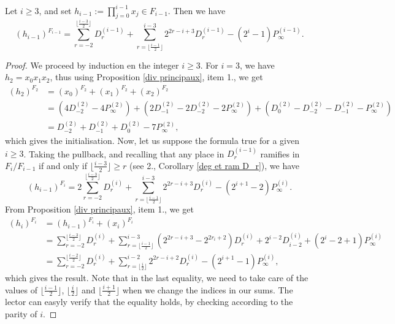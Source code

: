 \documentclass[10pt]{article}
\begin{document}
\s

\begin{proposition} \label{function h}
Let $i \geq 3$, and set $h_{i-1} := \prod\limits_{j=0}^{i-1}x_j \in F_{i-1}$. Then we have 
\[(h_{i-1})^{F_{i-1}} = \sum\limits_{r=-2}^{\lfloor \frac{i-3}{2}\rfloor} D_r^{(i-1)} + \sum\limits_{r=\lfloor \frac{i-1}{2}\rfloor}^{i-3} 2^{2r-i+3}D_r^{(i-1)} - (2^{i}-1) P_{\infty}^{(i-1)}.\]

\end{proposition}

\s

\begin{proof}
We proceed by induction en the integer $i \geq 3$. For $i=3$, we have $h_2 = x_0x_1x_2$, thus using Proposition \ref{div principaux}, item 1., we get
\begin{align*}
(h_2)^{F_2} &= (x_0)^{F_2} + (x_1)^{F_2} + (x_2)^{F_2} \\
&= (4D_{-2}^{(2)}-4P_{\infty}^{(2)}) + (2D_{-1}^{(2)}-2D_{-2}^{(2)} - 2P_{\infty}^{(2)}) + (D_0^{(2)} - D_{-2}^{(2)} - D_{-1}^{(2)} - P_{\infty}^{(2)}) \\
&= D_{-2}^{(2)} + D_{-1}^{(2)} + D_{0}^{(2)} - 7P_{\infty}^{(2)},
\end{align*}
which gives the initialisation. Now, let us suppose the formula true for a given $i \geq 3$. Taking the pullback, and recalling that any place in $D_r^{(i-1)}$ ramifies in $F_i/F_{i-1}$ if and only if $\lfloor \frac{i-3}{2} \rfloor \geq r$ (see 2., Corollary \ref{deg et ram D_r}), we have
\[(h_{i-1})^{F_i} = 2\sum\limits_{r=-2}^{\lfloor \frac{i-3}{2}\rfloor} D_r^{(i)} + \sum\limits_{r=\lfloor \frac{i-1}{2}\rfloor}^{i-3} 2^{2r-i+3}D_r^{(i)} - (2^{i+1}-2) P_{\infty}^{(i)}.\]
From Proposition \ref{div principaux}, item 1., we get
\begin{align*}
(h_i)^{F_i} &= (h_{i-1})^{F_i} + (x_i)^{F_i} \\
&= \sum\limits_{r=-2}^{\lfloor \frac{i-3}{2}\rfloor} D_r^{(i)} + \sum\limits_{r=\lfloor \frac{i-1}{2}\rfloor}^{i-3} (2^{2r-i+3}-2^{2r_i+2})D_r^{(i)} + 2^{i-2}D_{i-2}^{(i)} + (2^{i}-2+1) P_{\infty}^{(i)} \\
&= \sum\limits_{r=-2}^{\lfloor \frac{i-2}{2}\rfloor} D_r^{(i)} +
 \sum\limits_{r=\lfloor \frac{i}{2}\rfloor}^{i-2} 2^{2r-i+2}D_r^{(i)} - (2^{i+1}-1) P_{\infty}^{(i)},
\end{align*}
which gives the result. Note that in the last equality, we need to take care of the values of $\lfloor \frac{i-1}{2} \rfloor$,  $\lfloor \frac{i}{2} \rfloor$ and $\lfloor \frac{i+1}{2} \rfloor$ when we change the indices in our sums. The lector can easyly verify that the equality holds, by checking according to the parity of $i$.
\end{proof}
\end{document}
